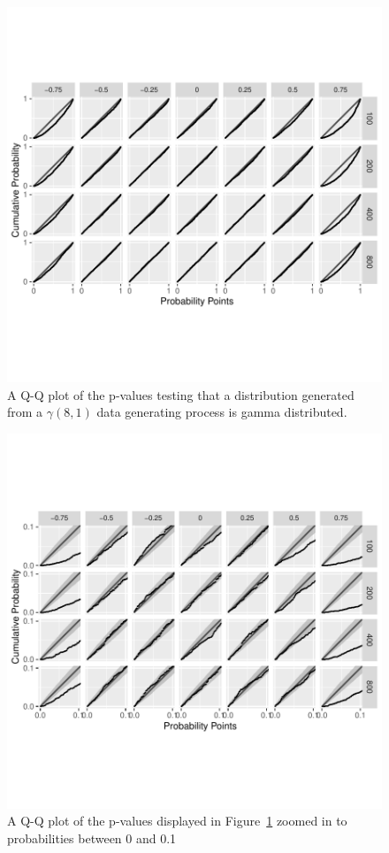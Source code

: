 \documentclass[12pt, titlepage, letterpaper]{article}
\begin{document}
{\begin{figure}[tbp]
  \centering
  \includegraphics[scale=1]{figures/gamma}
  \caption{A Q-Q plot of the p-values testing that a distribution
  generated from a $\gamma(8,1)$ data generating process is gamma distributed.}
  \label{fig:gamma}
\end{figure}

\begin{figure}[tbp]
  \centering
  \includegraphics[scale=1]{figures/zoom_gamma}
  \caption{A Q-Q plot of the p-values displayed in Figure~\ref{fig:gamma} zoomed in to 
  probabilities between 0 and
  0.1}
  \label{fig:zoom_gamma}
\end{figure}

}
\end{document}
